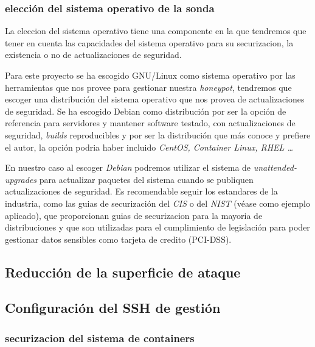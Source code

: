 \subsubsection{elección del sistema operativo de la sonda}

La eleccion del sistema operativo tiene una componente en la que tendremos que tener en cuenta las capacidades del sistema operativo para su securizacion,
la existencia o no de actualizaciones de seguridad.

Para este proyecto se ha escogido GNU/Linux como sistema operativo por las herramientas que nos provee para gestionar nuestra \emph{honeypot}, 
tendremos que escoger una distribución del sistema operativo que nos provea de actualizaciones de seguridad. 
Se ha escogido Debian como distribución por ser la opción de referencia para servidores y mantener software testado, con actualizaciones de seguridad, \emph{builds} reproducibles y por ser la distribución que más conoce y prefiere el autor, la opción podria haber incluido \emph{CentOS, Container Linux, RHEL \ldots} 

En nuestro caso al escoger \emph{Debian} podremos utilizar el sistema de \emph{unattended-upgrades} para actualizar paquetes del sistema cuando se publiquen actualizaciones de seguridad. Es recomendable seguir
los estandares de la industria, como las guias de securización del \emph{CIS} o del \emph{NIST} (véase \cite{ovh-debian-cis} como ejemplo aplicado), que proporcionan guias de securizacion para la mayoria de distribuciones y que son utilizadas para el cumplimiento de legislación para poder gestionar datos sensibles como tarjeta de credito (PCI-DSS). 

\subsection{Reducción de la superficie de ataque}

\subsection{Configuración del SSH de gestión}



\subsubsection{securizacion del sistema de containers}

